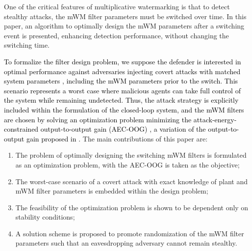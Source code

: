 One of the critical features of multiplicative watermarking is that to detect stealthy attacks, the mWM filter parameters must be switched over time. In this paper, an algorithm to optimally design the mWM parameters after a switching event is presented, enhancing detection performance, without changing the switching time.

\textcolor{black}{
To formalize the filter design problem, we suppose the defender is interested in optimal performance against adversaries injecting covert attacks with matched system parameters \citep{smith2015covert}, including the mWM parameters prior to the switch. This scenario represents a worst case where malicious agents can take full control of the system while remaining undetected.
Thus, the attack strategy is explicitly included within the formulation of the closed-loop system, and the mWM filters are chosen by solving an optimization problem minimizing the attack-energy-constrained output-to-output gain (AEC-OOG) \citep{anand2023risk}, a variation of the output-to-output gain proposed in  \cite{teixeira2015strategic}.
}
The main contributions of this paper are:
\begin{enumerate}
\item The problem of optimally designing the switching mWM filters is formulated as an optimization problem, with the AEC-OOG is taken as the objective;%
\item The worst-case scenario of a covert attack with exact knowledge of plant and mWM filter parameters is embedded within the design problem;
\item The feasibility of the optimization problem is shown to be dependent only on stability conditions; 
\item A solution scheme is proposed to promote randomization of the mWM filter parameters such that an eavesdropping adversary cannot remain stealthy.
\end{enumerate} 

